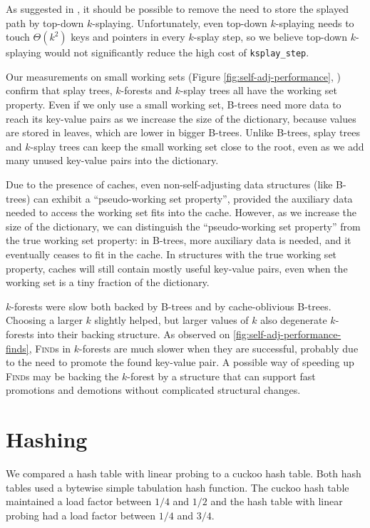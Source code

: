 As suggested in \cite{ksplay-sherk}, it should be possible to remove the
need to store the splayed path by top-down \mbox{$k$-splaying}.
Unfortunately, even top-down \mbox{$k$-splaying} needs to touch
$\Theta(k^2)$ keys and pointers in every $k$-splay step, so we believe top-down
\mbox{$k$-splaying} would not significantly reduce the high cost of
\texttt{ksplay\_step}.

Our measurements on small working sets (Figure
\ref{fig:self-adj-performance},
) confirm that splay trees, $k$-forests
and $k$-splay trees all have the working set property.
Even if we only use a small working set, B-trees need more data to reach
its key-value pairs as we increase the size of the dictionary, because values
are stored in leaves, which are lower in bigger B-trees.
Unlike B-trees, splay trees and $k$-splay trees can keep the small working set
close to the root, even as we add many unused key-value pairs into the
dictionary.

Due to the presence of caches, even non-self-adjusting data structures (like
B-trees) can exhibit a ``pseudo-working set property'', provided the auxiliary
data needed to access the working set fits into the cache. However, as we
increase the size of the dictionary, we can distinguish the ``pseudo-working
set property'' from the true working set property: in B-trees, more auxiliary
data is needed, and it eventually ceases to fit in the cache.
In structures with the true working set property, caches will still contain
mostly useful key-value pairs, even when the working set is a tiny fraction
of the dictionary.

$k$-forests were slow both backed by B-trees and by cache-oblivious B-trees.
Choosing a larger $k$ slightly helped, but larger values of $k$ also degenerate
\mbox{$k$-forests} into their backing structure.
As observed on \ref{fig:self-adj-performance-finds}, \textsc{Find}s in
$k$-forests are much slower when they are successful, probably due to the need
to promote the found key-value pair. A possible way of speeding up
\textsc{Find}s may be backing the $k$-forest by a structure that can support
fast promotions and demotions without complicated structural changes.

\section{Hashing}
\label{sec:hashing-results}
We compared a hash table with linear probing to a cuckoo hash table.
Both hash tables used a bytewise simple tabulation hash function.
The cuckoo hash table maintained a load factor between $1/4$ and
$1/2$ and the hash table with linear probing had a load factor
between $1/4$ and $3/4$.

